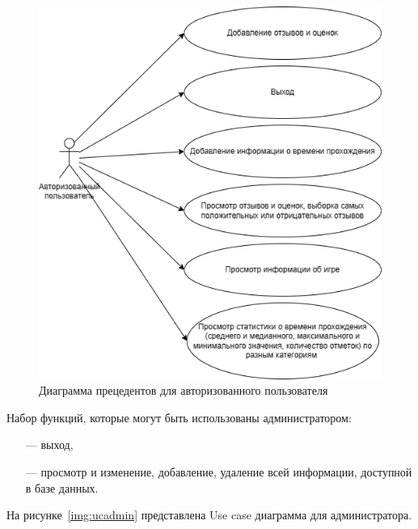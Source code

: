 \begin{figure}[H]
	\begin{center}
		\includegraphics[scale=0.8]{../imgs/user.png}
	\end{center}
	\captionsetup{justification=centering}
	\caption{Диаграмма прецедентов для авторизованного пользователя\\}
	\label{img:ucuser}
\end{figure}

Набор функций, которые могут быть использованы администратором:
	\begin{itemize}
		\item[---] выход,
		\item[---] просмотр и изменение, добавление, удаление всей информации, доступной в базе данных.
	\end{itemize}

На рисунке~\ref{img:ucadmin} представлена Use case диаграмма для администратора.

